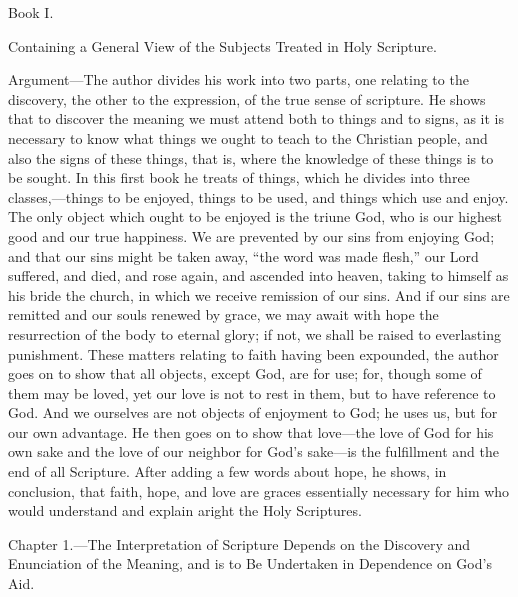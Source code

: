 
Book I.

Containing a General View of the Subjects Treated in Holy Scripture.

Argument—The author divides his work into two parts, one relating to the discovery, the other to the expression, of the true sense of scripture. He shows that to discover the meaning we must attend both to things and to signs, as it is necessary to know what things we ought to teach to the Christian people, and also the signs of these things, that is, where the knowledge of these things is to be sought. In this first book he treats of things, which he divides into three classes,—things to be enjoyed, things to be used, and things which use and enjoy. The only object which ought to be enjoyed is the triune God, who is our highest good and our true happiness. We are prevented by our sins from enjoying God; and that our sins might be taken away, “the word was made flesh,” our Lord suffered, and died, and rose again, and ascended into heaven, taking to himself as his bride the church, in which we receive remission of our sins. And if our sins are remitted and our souls renewed by grace, we may await with hope the resurrection of the body to eternal glory; if not, we shall be raised to everlasting punishment. These matters relating to faith having been expounded, the author goes on to show that all objects, except God, are for use; for, though some of them may be loved, yet our love is not to rest in them, but to have reference to God. And we ourselves are not objects of enjoyment to God; he uses us, but for our own advantage. He then goes on to show that love—the love of God for his own sake and the love of our neighbor for God’s sake—is the fulfillment and the end of all Scripture. After adding a few words about hope, he shows, in conclusion, that faith, hope, and love are graces essentially necessary for him who would understand and explain aright the Holy Scriptures.


Chapter 1.—The Interpretation of Scripture Depends on the Discovery and Enunciation of the Meaning, and is to Be Undertaken in Dependence on God’s Aid.

